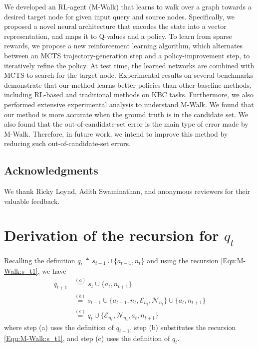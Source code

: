 \documentclass{article}
\newcommand{\nn}{\nonumber}
\newcommand{\defeq}{\triangleq}
\newcommand{\mc}{\mathcal}
\newcommand{\modelname}{M-Walk}
\begin{document}
	We developed an RL-agent (\modelname) that learns to walk over a graph towards a desired target node for given input query and source nodes. Specifically, we proposed a novel neural architecture that encodes the state into a vector representation, and maps it to Q-values and a policy. To learn from sparse rewards, we propose a new reinforcement learning algorithm, which alternates between an MCTS trajectory-generation step and a policy-improvement step, to iteratively refine the policy. At test time, the learned networks are combined with MCTS to search for the target node. Experimental results on several benchmarks demonstrate that our method learns better policies than other baseline methods, including RL-based and traditional methods on KBC tasks. Furthermore, we also performed extensive experimental analysis to understand \modelname. We found that our method is more accurate when the ground truth is in the candidate set. We also found that the out-of-candidate-set error is the main type of error made by M-Walk. Therefore, in future work, we intend to improve this method by reducing such out-of-candidate-set errors.
	
\subsection*{Acknowledgments}
We thank Ricky Loynd, Adith Swaminathan, and anonymous reviewers for their valuable feedback.


	
	
	
	
\clearpage
	
	\appendix

\section{Derivation of the recursion for $q_t$}
\label{Appendix:qt_derivation}

Recalling the definition $q_t \defeq s_{t-1} \cup \{a_{t-1},n_t\}$ and using the recursion \eqref{Equ:\modelname:s_t1}, we have
    \begin{align}
        q_{t+1}     &\overset{(a)}{=}  
                            s_t \cup \{a_t, n_{t+1} \}
                            \nn\\
                    &\overset{(b)}{=}
                            s_{t-1} \cup \{a_{t-1}, n_t, \mc{E}_{n_t}, \mc{N}_{n_t} \}
                            \cup \{ a_t, n_{t+1} \}
                            \nn\\
                    &\overset{(c)}{=}
                            q_t \cup \{ \mc{E}_{n_t}, \mc{N}_{n_t}, a_t, n_{t+1} \}
                            \nn
    \end{align}
where step (a) uses the definition of $q_{t+1}$, step (b) substitutes the recursion \eqref{Equ:\modelname:s_t1}, and step (c) uses the definition of $q_t$.
\end{document}
